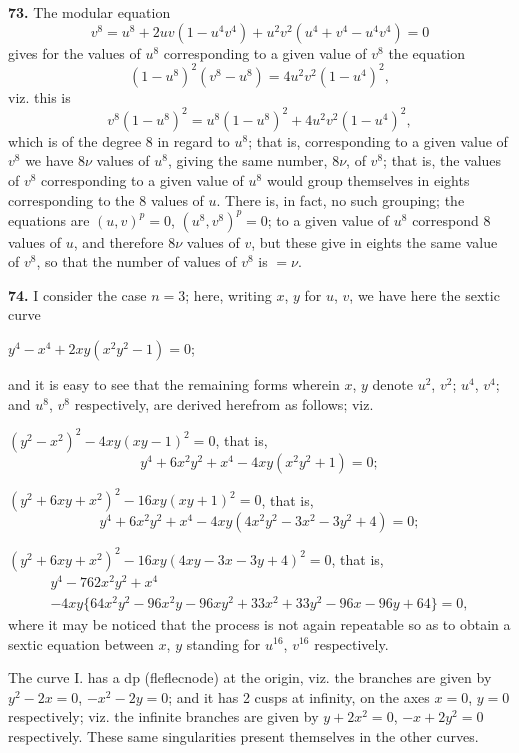 \documentclass[11pt,a4paper]{book}
\begin{document}
\textbf{73.} The modular equation
\[
v^8 = u^8 + 2uv(1 - u^4 v^4) + u^2 v^2(u^4 + v^4 - u^4 v^4) = 0
\]
gives for the values of $u^8$ corresponding to a given value of $v^8$ the equation
\[
(1 - u^8)^2(v^8 - u^8) = 4u^2 v^2(1 - u^4)^2,
\]
viz. this is
\[
v^8(1 - u^8)^2 = u^8(1 - u^8)^2 + 4u^2 v^2(1 - u^4)^2,
\]
which is of the degree $8$ in regard to $u^8$; that is, corresponding to a given value of $v^8$ we have $8\nu$ values of $u^8$, giving the same number, $8\nu$, of $v^8$; that is, the values of $v^8$ corresponding to a given value of $u^8$ would group themselves in eights corresponding to the 8 values of $u$. There is, in fact, no such grouping; the equations are $(u, v)^p = 0$, $(u^8, v^8)^p = 0$; to a given value of $u^8$ correspond 8 values of $u$, and therefore $8\nu$ values of $v$, but these give in eights the same value of $v^8$, so that the number of values of $v^8$ is $= \nu$.

\textbf{74.} I consider the case $n = 3$; here, writing $x$, $y$ for $u$, $v$, we have here the sextic curve

 \quad $y^4 - x^4 + 2xy(x^2 y^2 - 1) = 0$;

and it is easy to see that the remaining forms wherein $x$, $y$ denote $u^2$, $v^2$; $u^4$, $v^4$; and $u^8$, $v^8$ respectively, are derived herefrom as follows; viz.

 \quad $(y^2 - x^2)^2 - 4xy(xy - 1)^2 = 0$, that is,
\[
y^4 + 6x^2 y^2 + x^4 - 4xy(x^2 y^2 + 1) = 0;
\]

 \quad $(y^2 + 6xy + x^2)^2 - 16xy(xy + 1)^2 = 0$, that is,
\[
y^4 + 6x^2 y^2 + x^4 - 4xy(4x^2 y^2 - 3x^2 - 3y^2 + 4) = 0;
\]

 \quad $(y^2 + 6xy + x^2)^2 - 16xy(4xy - 3x - 3y + 4)^2 = 0$, that is,
\begin{multline*}
y^4 - 762x^2 y^2 + x^4 \\
- 4xy\{64x^2 y^2 - 96x^2 y - 96xy^2 + 33x^2 + 33y^2 - 96x - 96y + 64\} = 0,
\end{multline*}
where it may be noticed that the process is not again repeatable so as to obtain a sextic equation between $x$, $y$ standing for $u^{16}$, $v^{16}$ respectively.

The curve I. has a dp (fleflecnode) at the origin, viz. the branches are given by $y^2 - 2x = 0$, $-x^2 - 2y = 0$; and it has 2 cusps at infinity, on the axes $x = 0$, $y = 0$ respectively; viz. the infinite branches are given by $y + 2x^2 = 0$, $-x + 2y^2 = 0$ respectively. These same singularities present themselves in the other curves.
\end{document}

